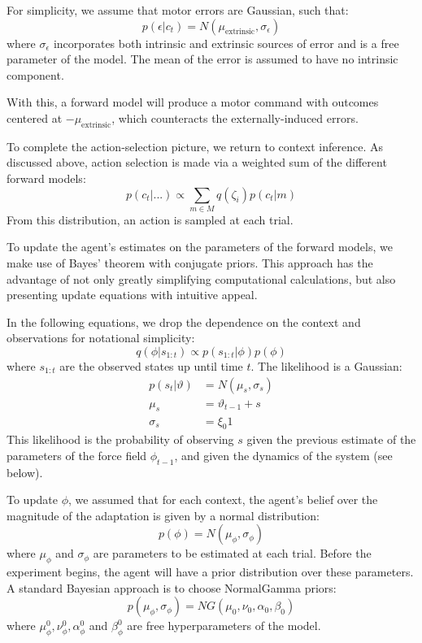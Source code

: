 \documentclass[a4paper,doc,floatsintext,natbib]{apa6}
\begin{document}
For simplicity, we assume that motor errors are Gaussian, such that:
\begin{equation}
p(\epsilon | c_t) = N(\mu_{\text{extrinsic}}, \sigma_\epsilon)
\end{equation}
where $\sigma_\epsilon$ incorporates both intrinsic and extrinsic sources of
error and is a free parameter of the model. The mean of the error is assumed to
have no intrinsic component.

With this, a forward model will produce a motor command with outcomes centered
at $-\mu_{\text{extrinsic}}$, which counteracts the externally-induced errors.

To complete the action-selection picture, we return to context inference. As
discussed above, action selection is made via a weighted sum of the different
forward models:
\begin{equation}
p(c_t | ...) \propto \displaystyle \sum_{m \in M} q(\zeta_i)p(c_t | m)
\end{equation}
From this distribution, an action is sampled at each trial.

To update the agent's estimates on the parameters of the forward models, we
make use of Bayes' theorem with conjugate priors. This approach has the
advantage of not only greatly simplifying computational calculations, but also
presenting update equations with intuitive appeal.

In the following equations, we drop the dependence on the context and
observations for notational simplicity:
\begin{equation}
q(\phi | s_{1:t}) \propto p(s_{1:t} | \phi)p(\phi)
\end{equation}
where $s_{1:t}$ are the observed states up until time $t$. The likelihood is a
Gaussian:
\begin{align}
  p(s_t | \vartheta) &= N(\mu_s, \sigma_s)  \\
  \mu_s &= \vartheta_{t-1} + s \\
  \sigma_s &= \xi_0 1
\end{align}
This likelihood is the probability of observing $s$ given the previous estimate
of the parameters of the force field $\phi_{t-1}$, and given the dynamics of
the system (see below).

To update $\phi$, we assumed that for each context, the agent's belief over
the magnitude of the adaptation is given by a normal distribution:
\begin{equation}
p(\phi) = N(\mu_\phi, \sigma_\phi) \label{eqn:data-dist}
\end{equation}
where $\mu_\phi$ and $\sigma_\phi$ are parameters to be estimated at each
trial. Before the experiment begins, the agent will have a prior distribution
over these parameters. A standard Bayesian approach is to choose NormalGamma
priors:
\begin{equation}
p(\mu_\phi, \sigma_\phi) = NG(\mu_0, \nu_0, \alpha_0, \beta_0)
\end{equation}
where $\mu_{\phi}^0, \nu_{\phi}^0, \alpha_{\phi}^0$ and $\beta_{\phi}^0$ are free hyperparameters of the
model.
\end{document}
